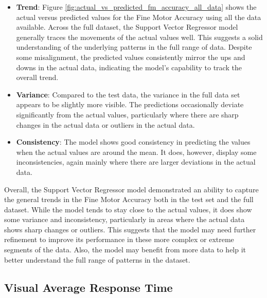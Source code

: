 \begin{itemize}
    \item \textbf{Trend}: Figure \ref{fig:actual_vs_predicted_fm_accuracy_all_data} shows the actual versus predicted values for the Fine Motor Accuracy using all the data available.
          Across the full dataset, the Support Vector Regressor model generally traces the movements of the actual values well. This suggests a solid understanding of the underlying patterns
          in the full range of data. Despite some misalignment, the predicted values consistently mirror the ups and downs in the actual data, indicating the model's capability to track the
          overall trend.
    \item \textbf{Variance}: Compared to the test data, the variance in the full data set appears to be slightly more visible. The predictions occasionally deviate significantly from the
          actual values, particularly where there are sharp changes in the actual data or outliers in the actual data.
    \item \textbf{Consistency}: The model shows good consistency in predicting the values when the actual values are around the mean. It does, however, display some inconsistencies, again
          mainly where there are larger deviations in the actual data.
\end{itemize}

Overall, the Support Vector Regressor model demonstrated an ability to capture the general trends in the Fine Motor Accuracy both in the test set and the full dataset. While the model tends
to stay close to the actual values, it does show some variance and inconsistency, particularly in areas where the actual data shows sharp changes or outliers. This suggests that the
model may need further refinement to improve its performance in these more complex or extreme segments of the data. Also, the model may benefit from more data to help it better understand
the full range of patterns in the dataset.

\subsection*{Visual Average Response Time}


